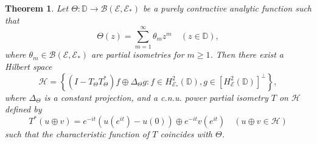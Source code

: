 \documentclass[12pt]{amsart}
\newcommand{\clb}{\mathcal{B}}
\newcommand{\clh}{\mathcal{H}}
\newcommand{\D}{\mathbb{D}}
\newcommand{\E}{\mathcal{E}}
\newcommand{\he}{{H}^2_\mathcal{E}(\mathbb{D})}
\theoremstyle{definition}
\theoremstyle{plain}
\newtheorem{thm}{Theorem}[section]
\theoremstyle{definition}
\numberwithin{equation}{section}
\begin{document}
\begin{thm}\label{mainthm}
Let $\Theta : \D \rightarrow \clb(\E,\E_*)$ be a purely contractive analytic function such that 
\[
\Theta( z)=\sum_{m=1}^\infty  \theta_mz^m \quad (z \in \D),
\]
where $\theta_m \in \mathcal{B}(\E,\E_*)$ are partial isometries for $m \geq 1$. Then there exist a Hilbert space 
\[
\clh=\left\{(I-T_\Theta T_\Theta^*)f\oplus \Delta_{\Theta} g: f \in H^2_{\E_*}(\D), g \in [\he]^\perp\right\},
\]
where $\Delta_{\Theta}$ is a constant projection, and a c.n.u. power partial isometry $T$ on $\clh$ defined by
\[
T^*(u \oplus v) = e^{-it}(u(e^{it}) - u(0)) \oplus e^{-it} v(e^{it}) \quad (u \oplus v \in \clh)
\]
such that the characteristic function of $T$ coincides with $\Theta$.
\end{thm}
\end{document}

